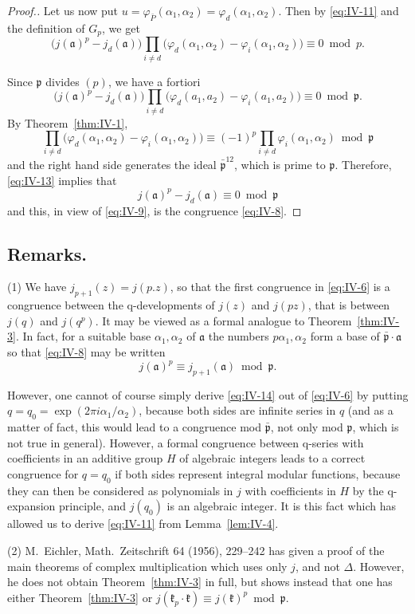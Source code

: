 \begin{proof}[Proof.]
Let us now put $u=\varphi_{\bar{P}}(\alpha_{1},\alpha_{2})
=\varphi_{d}(\alpha_{1},\alpha_{2})$. Then by \eqref{eq:IV-11} and the
definition of $G_{p}$, we get
\[
\bigl(j(\mathfrak{a})^{p}-j_{d}(\mathfrak{a})\bigr)
\prod_{i\neq d}\bigl(\varphi_{d}(\alpha_{1},\alpha_{2})
-\varphi_{i}(\alpha_{1},\alpha_{2})\bigr)\equiv 0\bmod p.
\tag{12}\label{eq:IV-12}
\]

Since $\mathfrak{p}$ divides $(p)$, we have a fortiori
\[
\bigl(j(\mathfrak{a})^{p}-j_{d}(\mathfrak{a})\bigr)
\prod_{i\neq d}\bigl(\varphi_{d}(a_{1},a_{2})
-\varphi_{i}(a_{1},a_{2})\bigr)\equiv 0\bmod\mathfrak{p}.
\tag{13}\label{eq:IV-13}
\]
By Theorem~\ref{thm:IV-1},
\[
\prod_{i\neq d}\bigl(\varphi_{d}(\alpha_{1},\alpha_{2})
-\varphi_{i}(\alpha_{1},\alpha_{2})\bigr)
\equiv(-1)^{p}\prod_{i\neq d}\varphi_{i}(\alpha_{1},\alpha_{2})
\bmod\mathfrak{p}
\]
and the right hand side generates the ideal $\bar{\mathfrak{p}}^{12}$,
which is prime to $\mathfrak{p}$. Therefore, \eqref{eq:IV-13} implies
that
\[
j(\mathfrak{a})^{p}-j_{d}(\mathfrak{a})\equiv 0\bmod\mathfrak{p}
\]
and this, in view of \eqref{eq:IV-9}, is the congruence
\eqref{eq:IV-8}.
\end{proof}

\subsection*{Remarks.}

\noindent
(1) We have $j_{p+1}(z)=j(p.z)$, so that the first congruence in
\eqref{eq:IV-6} is a congruence between the q-developments of $j(z)$ and
$j(pz)$, that is between $j(q)$ and $j(q^{p})$. It may be viewed as a
formal analogue to Theorem~\ref{thm:IV-3}. In fact, for a suitable base
$\alpha_{1},\alpha_{2}$ of $\mathfrak{a}$ the numbers
$p\alpha_{1},\alpha_{2}$ form a base of $\bar{\mathfrak{p}}\cdot
\mathfrak{a}$ so that \eqref{eq:IV-8} may be written
\[
j(\mathfrak{a})^{p}\equiv j_{p+1}(\mathfrak{a})\bmod\mathfrak{p}.
\tag{14}\label{eq:IV-14}
\]
\begin{sloppypar}
However, one cannot of course simply derive \eqref{eq:IV-14} out of
\eqref{eq:IV-6} by putting $q=q_{0}=\exp(2\pi i\alpha_{1}/\alpha_{2})$,
because both sides are infinite series in $q$ (and as a matter of fact,
this would lead to a congruence mod $\bar{\mathfrak{p}}$, not only mod
$\mathfrak{p}$, which is not true in general). However, a formal
congruence between q-series with coefficients in an additive group $H$ of
algebraic integers leads to a correct congruence for $q=q_{0}$ if both
sides represent integral modular functions, because they can then be
considered as polynomials in $j$ with coefficients in $H$ by the
q-expansion principle, and $j(q_{0})$ is an algebraic integer. It is this
fact which has allowed us to derive \eqref{eq:IV-11} from
Lemma~\ref{lem:IV-4}.
\end{sloppypar}

\medskip\noindent
(2) M.~Eichler, Math.\ Zeitschrift 64 (1956), 229--242
\cite{eichler1956quadratische} has given a proof of the main theorems of
complex multiplication which uses only $j$, and not $\Delta$. However, he
does not obtain Theorem~\ref{thm:IV-3} in full, but shows instead that one
has either Theorem~\ref{thm:IV-3} or
$j(\mathfrak{k}_{p}\cdot\mathfrak{k})\equiv j(\mathfrak{k})^{p}\bmod
\mathfrak{p}$.
